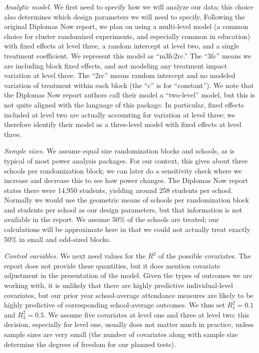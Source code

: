 \documentclass[
]{article}
\begin{document}
\emph{Analytic model.} We first need to specify how we will analyze our
data; this choice also determines which design parameters we will need
to specify. Following the original Diplomas Now report, we plan on using
a multi-level model (a common choice for cluster randomized experiments,
and especially common in education) with fixed effects at level three, a
random intercept at level two, and a single treatment coefficient. We
represent this model as ``m3fc2rc.'' The ``3fc'' means we are including
block fixed effects, and not modeling any treatment impact variation at
level three. The ``2rc'' means random intercept and no modeled variation
of treatment within each block (the ``c'' is for ``constant''). We note
that the Diplomas Now report authors call their model a ``two-level''
model, but this is not quite aligned with the language of this package.
In particular, fixed effects included at level two are actually
accounting for variation at level three; we therefore identify their
model as a three-level model with fixed effects at level three.

\emph{Sample sizes.} We assume equal size randomization blocks and
schools, as is typical of most power analysis packages. For our context,
this gives about three schools per randomization block; we can later do
a sensitivity check where we increase and decrease this to see how power
changes. The Diplomas Now report states there were 14,950 students,
yielding around 258 students per school. Normally we would use the
geometric means of schools per randomization block and students per
school as our design parameters, but that information is not available
in the report. We assume 50\% of the schools are treated; our
calculations will be approximate here in that we could not actually
treat exactly 50\% in small and odd-sized blocks.

\emph{Control variables.} We next need values for the \(R^2\) of the
possible covariates. The report does not provide these quantities, but
it does mention covariate adjustment in the presentation of the model.
Given the types of outcomes we are working with, it is unlikely that
there are highly predictive individual-level covariates, but our prior
year school-average attendance measures are likely to be highly
predictive of corresponding school-average outcomes. We thus set
\(R^2_1 = 0.1\) and \(R^2_2 = 0.5\). We assume five covariates at level
one and three at level two; this decision, especially for level one,
usually does not matter much in practice, unless sample sizes are very
small (the number of covariates along with sample size determine the
degrees of freedom for our planned tests).
\end{document}
